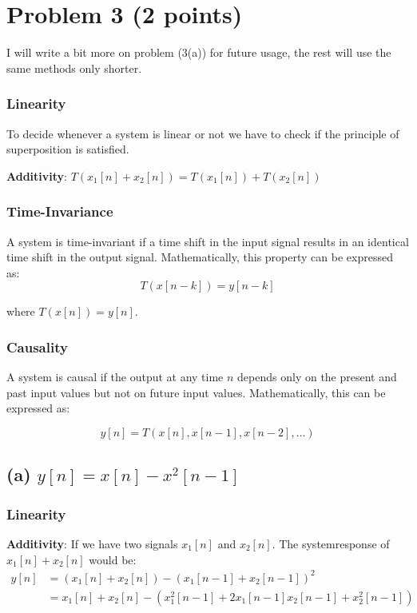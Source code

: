 \section{Problem 3 (2 points)}
I will write a bit more on problem (3(a)) for future usage, the rest will use the same methods only shorter.
\subsubsection*{Linearity}
To decide whenever a system is linear or not we have to check if the principle of superposition is satisfied.

\textbf{Additivity}: \( T(x_1[n] + x_2[n]) = T(x_1[n]) + T(x_2[n]) \)

\subsubsection*{Time-Invariance}

A system is time-invariant if a time shift in the input signal results in an identical time shift in the output signal. Mathematically, this property can be expressed as:
\begin{equation}
     T(x[n - k]) = y[n - k] 
\end{equation}


where \( T(x[n]) = y[n] \).

\subsubsection*{Causality}

A system is causal if the output at any time \( n \) depends only on the present and past input values but not on future input values. Mathematically, this can be expressed as:

\[ y[n] = T(x[n], x[n-1], x[n-2], \ldots) \]

\subsection*{(a) $y[n]=x[n]-x^2[n-1]$}

\subsubsection*{Linearity}

\textbf{Additivity}: If we have two signals $x_1[n]$ and $x_2[n]$. The systemresponse of $x_1[n]+x_2[n]$ would be:
\begin{align}
    y[n] &= (x_{1}[n] + x_{2}[n]) - (x_{1}[n-1] + x_{2}[n-1])^{2} \\
    &= x_{1}[n] + x_{2}[n] - (x_{1}^{2}[n-1] + 2 x_{1}[n-1] x_{2}[n-1] + x_{2}^{2}[n-1])
\end{align}
    
